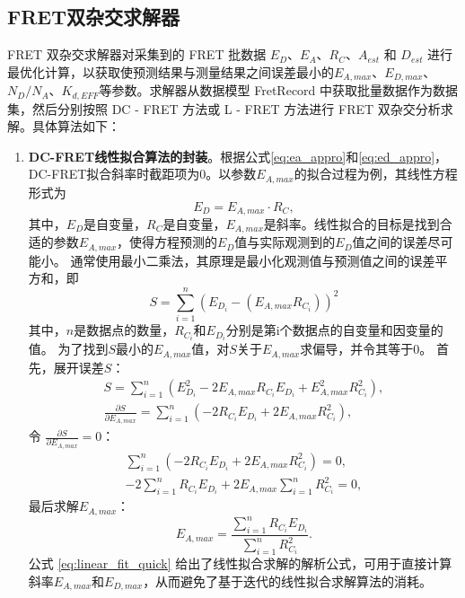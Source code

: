 \subsection{FRET双杂交求解器}
FRET 双杂交求解器对采集到的 FRET 批数据 $E_D$、$E_A$、$R_C$、$A_{est}$ 和 $D_{est}$ 进行最优化计算，以获取使预测结果与测量结果之间误差最小的$E_{A,max}$、$E_{D,max}$、$N_D / N_A$、$K_{d,EFF}$等参数。求解器从数据模型 FretRecord 中获取批量数据作为数据集，然后分别按照 DC - FRET 方法或 L - FRET 方法进行 FRET 双杂交分析求解。具体算法如下：
\begin{enumerate}
  \item \textbf{DC-FRET线性拟合算法的封装}。根据公式\ref{eq:ea_appro}和\ref{eq:ed_appro}，DC-FRET拟合斜率时截距项为0。以参数$E_{A,max}$的拟合过程为例，其线性方程形式为
  \begin{equation}
      E_D = E_{A,max}\cdot R_C,
  \end{equation}
  其中，$E_D$是自变量，$R_C$是自变量，$E_{A,max}$是斜率。线性拟合的目标是找到合适的参数$E_{A,max}$，使得方程预测的$E_D$值与实际观测到的$E_D$值之间的误差尽可能小。
  通常使用最小二乘法，其原理是最小化观测值与预测值之间的误差平方和，即
  \begin{equation}
      S=\sum^{n}_{i=1}(E_{D_i}-(E_{A,max}R_{C_i}))^2
  \end{equation}
  其中，$n$是数据点的数量，$R_{C_i}$和$E_{D_i}$分别是第i个数据点的自变量和因变量的值。
  为了找到$S$最小的$E_{A,max}$值，对$S$关于$E_{A,max}$求偏导，并令其等于0。
  首先，展开误差$S$：
  \begin{align}
       S=\sum_{i = 1}^{n}(E_{D_i}^{2}-2E_{A,max}R_{C_i}E_{D_i} + E_{A,max}^{2}R_{C_i}^{2}), \\
       \frac{\partial S}{\partial E_{A,max}}=\sum_{i = 1}^{n}(-2R_{C_i}E_{D_i} + 2E_{A,max}R_{C_i}^{2}),
  \end{align}
  令 \(\frac{\partial S}{\partial E_{A,max}}=0\)：
  \begin{align}
       \sum_{i = 1}^{n}(-2R_{C_i}E_{D_i} + 2E_{A,max}R_{C_i}^{2}) = 0, \\
      -2\sum_{i = 1}^{n}R_{C_i}E_{D_i}+2E_{A,max}\sum_{i = 1}^{n}R_{C_i}^{2}=0,
  \end{align}
  最后求解$E_{A,max}$：
  \begin{equation}
         E_{A,max}=\frac{\sum_{i = 1}^{n}R_{C_i}E_{D_i}}{\sum_{i = 1}^{n}R_{C_i}^{2}}. \label{eq:linear_fit_quick}
  \end{equation}
  公式 \ref{eq:linear_fit_quick} 给出了线性拟合求解的解析公式，可用于直接计算斜率$E_{A,max}$和$E_{D,max}$，从而避免了基于迭代的线性拟合求解算法的消耗。


\end{enumerate}
